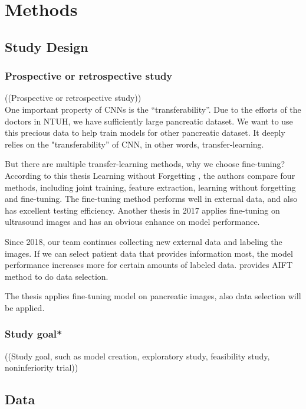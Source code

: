 \chapter{Methods}

\section{Study Design}
\subsection{Prospective or retrospective study}
((Prospective or retrospective study)) \\


One important property of CNNs is the “transferability”. Due to the efforts of the doctors in NTUH, we have sufficiently large pancreatic dataset. We want to use this precious data to help train models for other pancreatic dataset. It deeply relies on the "transferability” of CNN, in other words, transfer-learning. 

But there are multiple transfer-learning methods, why we choose fine-tuning? According to this thesis Learning without Forgetting \cite{li2017learning}, the authors compare four methods, including joint training, feature extraction, learning without forgetting and  fine-tuning. The fine-tuning method performs well in external data, and also has excellent testing efficiency. Another thesis in 2017 applies fine-tuning on ultrasound images and has an obvious enhance on model performance. \cite{chi2017thyroid}

Since 2018, our team continues collecting new external data and labeling the images. If we can select patient data that provides information most, the model performance increases more for certain amounts of labeled data. \cite{zhou2017fine} provides AIFT method to do data selection. 

The thesis applies fine-tuning model on pancreatic images, also data selection will be applied. 

\subsection{Study goal*}
((Study goal, such as model creation, exploratory study, feasibility study, noninferiority trial)) \\
\section{Data}
